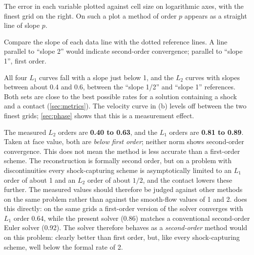 \documentclass[11pt]{article}
\begin{document}
\begin{figexplain}{}
\begin{fx}
\item[What is shown.] The error in each variable plotted against cell size on logarithmic
  axes, with the finest grid on the right.  On such a plot a method of order $p$ appears as
  a straight line of slope $p$.
\item[How to read it.] Compare the slope of each data line with the dotted reference lines.
  A line parallel to ``slope 2'' would indicate second-order convergence; parallel to
  ``slope 1'', first order.
\item[What it means.] All four $L_1$ curves fall with a slope just below 1, and the $L_2$
  curves with slopes between about 0.4 and 0.6, between the ``slope 1/2'' and ``slope 1''
  references.  Both sets are close to the best possible rates for a solution containing a
  shock and a contact (\cref{sec:metrics}).  The velocity curve in (b) levels off between
  the two finest grids; \cref{sec:phase} shows that this is a measurement effect.
\end{fx}
\end{figexplain}

\begin{keypoint}
The measured $L_2$ orders are \textbf{0.40 to 0.63}, and the $L_1$ orders are \textbf{0.81
to 0.89}.  Taken at face value, both are \emph{below first order}; neither norm shows
second-order convergence.  This does not mean the method is less accurate than a
first-order scheme.  The reconstruction is formally second order, but on a problem with
discontinuities every shock-capturing scheme is asymptotically limited to an $L_1$ order of
about 1 and an $L_2$ order of about $1/2$, and the contact lowers these further.  The
measured values should therefore be judged against other methods on the same problem
rather than against the smooth-flow values of 1 and 2.   does this
directly: on the same grids a first-order version of the solver converges with $L_1$ order
0.64, while the present solver (0.86) matches a conventional second-order Euler solver
(0.92).  The solver therefore behaves as a \emph{second-order} method would on this
problem: clearly better than first order, but, like every shock-capturing scheme, well below
the formal rate of 2.
\end{keypoint}


\end{document}
